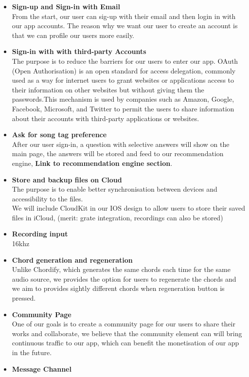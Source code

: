 \begin{itemize}

\item \textbf{Sign-up and Sign-in with Email}
\\From the start, our user can sig-up with their email and then login in with our app accounts. The reason why we want our user to create an account is that we can profile our users more easily.

\item \textbf{Sign-in with with third-party Accounts}
\\ The purpose is to reduce the barriers for our users to enter our app. OAuth (Open Authorisation) is an open standard for access delegation, commonly used as a way for internet users to grant websites or applications access to their information on other websites but without giving them the passwords.This mechanism is used by companies such as Amazon, Google, Facebook, Microsoft, and Twitter to permit the users to share information about their accounts with third-party applications or websites.

\item \textbf{Ask for song tag preference}
\\After our user sign-in, a question with selective answers will show on the main page, the answers will be stored and feed to our recommendation engine, \textbf{Link to recommendation engine section}.

\item \textbf{Store and backup files on Cloud}
\\The purpose is to enable better synchronisation between devices and accessibility to the files. 
\\We will include CloudKit in our IOS design to allow users to store their saved files in iCloud, (merit: grate integration, recordings can also be stored)

\item \textbf{Recording input}
\\ 16khz

\item \textbf{Chord generation and regeneration}
\\Unlike Chordify, which generates the same chords each time for the same audio source, we provides the option for users to regenerate the chords and we aim to provides sightly different chords when regeneration button is pressed.

\item \textbf{Community Page}
\\One of our goals is to create a community page for our users to share their works and collaborate, we believe that the community element can will bring continuous traffic to our app, which can benefit the monetisation of our app in the future.

\item \textbf{Message Channel}


\end{itemize}




